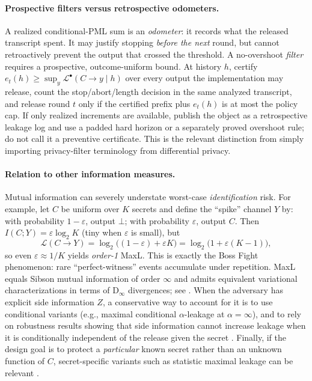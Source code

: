 \documentclass[11pt]{article}
\newcommand{\Dinfty}{\mathrm{D_{\infty}}}
\newcommand{\MaxL}{\mathcal{L}}
\newcommand{\PML}{\mathcal{L}^{\bullet}}
\newcommand{\logtwo}{\log_2}
\begin{document}
\paragraph{Prospective filters versus retrospective odometers.}
A realized conditional-PML sum is an \emph{odometer}: it records what the released transcript spent. It may justify stopping \emph{before the next} round, but cannot retroactively prevent the output that crossed the threshold.
A no-overshoot \emph{filter} requires a prospective, outcome-uniform bound. At history $h$, certify $e_t(h)\ge\sup_y \PML(C\!\to\!y\mid h)$ over every output the implementation may release, count the stop/abort/length decision in the same analyzed transcript, and release round $t$ only if the certified prefix plus $e_t(h)$ is at most the policy cap.
If only realized increments are available, publish the object as a retrospective leakage log and use a padded hard horizon or a separately proved overshoot rule; do not call it a preventive certificate. This is the relevant distinction from simply importing privacy-filter terminology from differential privacy.\cite{rogers2016privacyodometers}

\paragraph{Relation to other information measures.}
Mutual information can severely understate worst-case \emph{identification} risk.
For example, let $C$ be uniform over $K$ secrets and define the ``spike'' channel $Y$ by: with probability $1-\varepsilon$, output $\bot$; with probability $\varepsilon$, output $C$.
Then $I(C;Y)=\varepsilon\logtwo K$ (tiny when $\varepsilon$ is small), but
\[
\MaxL(C\!\to\!Y)=\logtwo\big((1-\varepsilon)+\varepsilon K\big)=\logtwo\big(1+\varepsilon(K-1)\big),
\]
so even $\varepsilon\approx 1/K$ yields \emph{order-1} MaxL.
This is exactly the Boss Fight phenomenon: rare ``perfect-witness'' events accumulate under repetition.
MaxL equals Sibson mutual information of order $\infty$ and admits equivalent variational characterizations in terms of $\Dinfty$ divergences; see \cite{issa2016sibson,issa2020operational,esposito2019renyi}.
When the adversary has explicit side information $Z$, a conservative way to account for it is to use conditional variants (e.g., maximal conditional $\alpha$-leakage at $\alpha=\infty$), and to rely on robustness results showing that side information cannot increase leakage when it is conditionally independent of the release given the secret \cite{liao2019sideinfo,liao2020malprops}.
Finally, if the design goal is to protect a \emph{particular} known secret rather than an unknown function of $C$, secret-specific variants such as statistic maximal leakage can be relevant \cite{wang2024statmaxl}.
\end{document}
